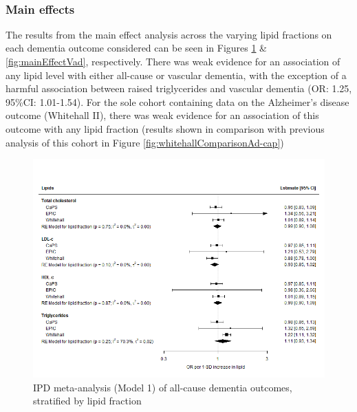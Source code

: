 \documentclass[a4paper, twoside]{templates/ociamthesis}
\begin{document}
~

\hypertarget{main-effects}{%
\subsubsection{Main effects}\label{main-effects}}

The results from the main effect analysis across the varying lipid fractions on each dementia outcome considered can be seen in Figures \ref{fig:mainEffectDem} \& \ref{fig:mainEffectVad}, respectively. There was weak evidence for an association of any lipid level with either all-cause or vascular dementia, with the exception of a harmful association between raised triglycerides and vascular dementia (OR: 1.25, 95\%CI: 1.01-1.54). For the sole cohort containing data on the Alzheimer's disease outcome (Whitehall II), there was weak evidence for an association of this outcome with any lipid fraction (results shown in comparison with previous analysis of this cohort in Figure \ref{fig:whitehallComparisonAd-cap})





\begin{figure}[H]
\includegraphics[width=1\linewidth]{figures/ipd/main_Dementia} \caption[IPD meta-analysis of all-cause dementia, stratified by lipid fraction]{IPD meta-analysis (Model 1) of all-cause dementia outcomes, stratified by lipid fraction}\label{fig:mainEffectDem}
\end{figure}
\end{document}
